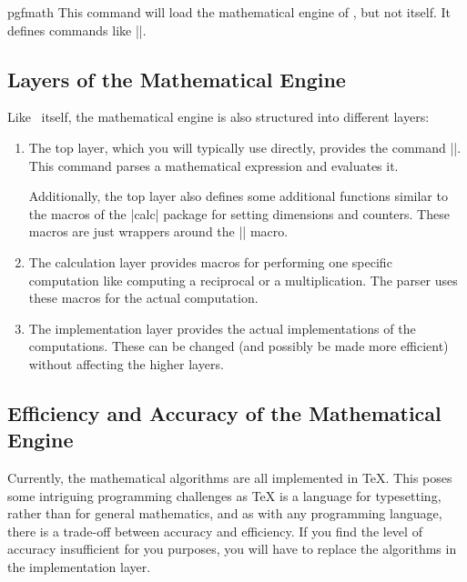 \begin{package}{pgfmath}
	This command will load the mathematical engine of \pgfname, but not
	\pgfname itself. It defines commands like |\pgfmathparse|.
\end{package}


\subsection{Layers of the Mathematical Engine}

Like \pgfname\ itself, the mathematical engine is also structured into
different layers:

\begin{enumerate}
\item
	The top layer, which you will typically use directly, provides
  the command |\pgfmathparse|. This command parses a mathematical
  expression and evaluates it.

  Additionally, the top layer also defines some additional functions
  similar to the macros of the |calc| package for setting dimensions
  and counters. These macros are just wrappers around the
  |\pgfmathparse| macro.

\item
	The calculation layer provides macros for performing one
  specific computation like computing a reciprocal or a
  multiplication. The parser uses these macros for the actual
  computation.

\item
	The implementation layer provides the actual implementations of
  the computations. These can be changed (and possibly be made more
  efficient) without affecting the higher layers.
\end{enumerate}



\subsection{Efficiency and Accuracy of the Mathematical Engine}

Currently, the mathematical algorithms are all implemented in \TeX.
This poses some intriguing programming challenges as \TeX{} is a
language for typesetting, rather than for general mathematics,
and as with any programming language, there is a trade-off between
accuracy and efficiency.
If you find the level of accuracy insufficient for you
purposes, you will have to replace the algorithms in the
implementation layer.

